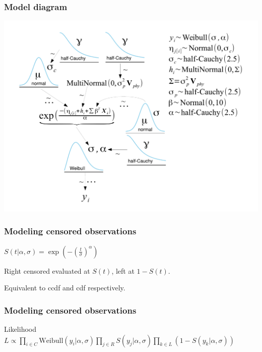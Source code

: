 \documentclass{beamer}
\begin{document}
\begin{frame}
  \frametitle{Model diagram}
  \begin{center}
    \includegraphics[height = 0.8\textheight, width = \textwidth,  keepaspectratio = true]{figure/mammal_survival_model}
  \end{center}
\end{frame}


\begin{frame}
  \frametitle{Modeling censored observations}
  \begin{definition}
    \(S(t | \alpha, \sigma) = \exp\left(-\left(\frac{t}{\sigma}\right)^{\alpha}\right)\)
  \end{definition}

  Right censored evaluated at \(S(t)\), left at \(1 - S(t)\). 
  
  Equivalent to ccdf and cdf respectively.
\end{frame}

\begin{frame}
  \frametitle{Modeling censored observations}
  \begin{block}{Likelihood}
    \(L \propto \prod_{i \in C} \mathrm{Weibull}(y_{i} | \alpha, \sigma) \prod_{j \in R} S(y_j | \alpha, \sigma) \prod_{k \in L} \left(1 - S(y_{k} | \alpha, \sigma)\right)\)
  \end{block}

\end{frame}
\end{document}
